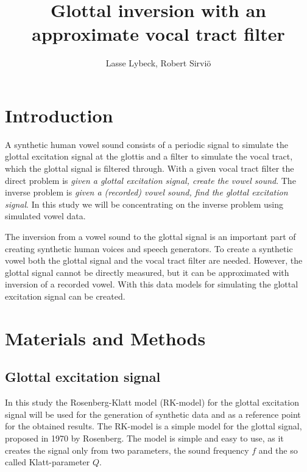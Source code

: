\documentclass[12pt,a4]{article}
\title{Glottal inversion with an approximate vocal tract filter}
\author{Lasse Lybeck, Robert Sirviö}
\begin{document}
\maketitle

\section{Introduction}
\label{sec:intro}

A synthetic human vowel sound consists of a periodic signal to simulate the glottal excitation signal at the glottis and a filter to simulate the vocal tract, which the glottal signal is filtered through.\cite{touda} With a given vocal tract filter the direct problem is \emph{given a glottal excitation signal, create the vowel sound}. The inverse problem is \emph{given a (recorded) vowel sound, find the glottal excitation signal}. In this study we will be concentrating on the inverse problem using simulated vowel data.

The inversion from a vowel sound to the glottal signal is an important part of creating synthetic human voices and speech generators. To create a synthetic vowel both the glottal signal and the vocal tract filter are needed. However, the glottal signal cannot be directly measured, but it can be approximated with inversion of a recorded vowel. With this data models for simulating the glottal excitation signal can be created.


\section{Materials and Methods}
\label{sec:methods}

\subsection{Glottal excitation signal}
\label{sec:rk}

In this study the Rosenberg-Klatt model (RK-model) for the glottal excitation signal will be used for the generation of synthetic data and as a reference point for the obtained results. The RK-model is a simple model for the glottal signal, proposed in 1970 by Rosenberg.\cite{rosenberg} The model is simple and easy to use, as it creates the signal only from two parameters, the sound frequency $f$ and the so called Klatt-parameter $Q$.
\end{document}
